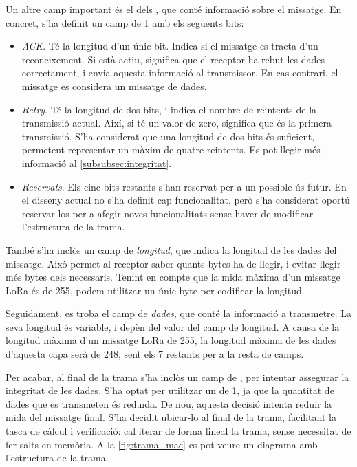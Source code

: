 \documentclass{tfgitic}[2024/07/01]
\begin{document}
Un altre camp important és el dels , que conté informació sobre el missatge. En concret, s'ha definit un camp de \SI{1}{\byte} amb els següents bits:
\begin{itemize}
    \item \emph{ACK}. Té la longitud d'un únic bit. Indica si el missatge es tracta d'un reconeixement. Si està actiu, significa que el receptor ha rebut les dades correctament, i envia aquesta informació al transmissor. En cas contrari, el missatge es considera un missatge de dades.
    \item \emph{Retry}. Té la longitud de dos bits, i indica el nombre de reintents de la transmissió actual. Així, si té un valor de zero, significa que és la primera transmissió. S'ha considerat que una longitud de dos bits és suficient, permetent representar un màxim de quatre reintents. Es pot llegir més informació al \autoref{subsubsec:integritat}.
    \item \emph{Reservats}. Els cinc bits restants s'han reservat per a un possible ús futur. En el disseny actual no s'ha definit cap funcionalitat, però s'ha considerat oportú reservar-los per a afegir noves funcionalitats sense haver de modificar l'estructura de la trama.
\end{itemize}

També s'ha inclòs un camp de \emph{longitud}, que indica la longitud de les dades del missatge. Això permet al receptor saber quants bytes ha de llegir, i evitar llegir més bytes dels necessaris. Tenint en compte que la mida màxima d'un missatge LoRa és de \SI{255}{\byte}, podem utilitzar un únic byte per codificar la longitud.

Seguidament, es troba el camp de \emph{dades}, que conté la informació a transmetre. La seva longitud és variable, i depèn del valor del camp de longitud. A causa de la longitud màxima d'un missatge LoRa de \SI{255}{\byte}, la longitud màxima de les dades d'aquesta capa serà de \SI{248}{\byte}, sent els \SI{7}{\byte} restants per a la resta de camps. 

Per acabar, al final de la trama s'ha inclòs un camp de , per intentar assegurar la integritat de les dades. S'ha optat per utilitzar un  de \SI{1}{\byte}, ja que la quantitat de dades que es transmeten és reduïda. De nou, aquesta decisió intenta reduir la mida del missatge final. S'ha decidit ubicar-lo al final de la trama, facilitant la tasca de càlcul i verificació: cal iterar de forma lineal la trama, sense necessitat de fer salts en memòria. A la \autoref{fig:trama_mac} es pot veure un diagrama amb l'estructura de la trama.
\end{document}
